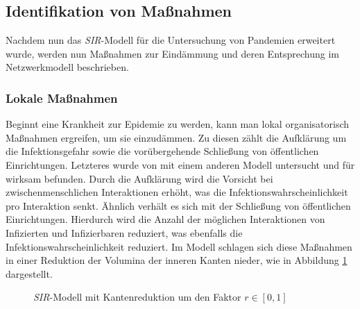 \steffen\subsection{Identifikation von Maßnahmen}
Nachdem nun das \emph{SIR}-Modell für die Untersuchung von Pandemien erweitert wurde, werden nun Maßnahmen zur Eindämmung und deren Entsprechung im Netzwerkmodell beschrieben. 

\subsubsection{Lokale Maßnahmen}
Beginnt eine Krankheit zur Epidemie zu werden, kann man lokal organisatorisch Maßnahmen ergreifen, um sie einzudämmen. Zu diesen zählt die Aufklärung um die Infektionsgefahr sowie die vorübergehende Schließung von öffentlichen Einrichtungen. Letzteres wurde von \cite{Milne2008} mit einem anderen Modell untersucht und für wirksam befunden. Durch die Aufklärung wird die Vorsicht bei zwischenmenschlichen Interaktionen erhöht, was die Infektionswahrscheinlichkeit pro Interaktion senkt. Ähnlich verhält es sich mit der Schließung von öffentlichen Einrichtungen. Hierdurch wird die Anzahl der möglichen Interaktionen von Infizierten und Infizierbaren reduziert, was ebenfalls die Infektionswahrscheinlichkeit reduziert. Im Modell schlagen sich diese Maßnahmen in einer Reduktion der Volumina der inneren Kanten nieder, wie in Abbildung \ref{fig:ssec:actions:local} dargestellt.

\begin{figure}
\begin{center}
\end{center}
\caption{\emph{SIR}-Modell mit Kantenreduktion um den Faktor $r\in[0,1]$}\label{fig:ssec:actions:local}
\end{figure}


